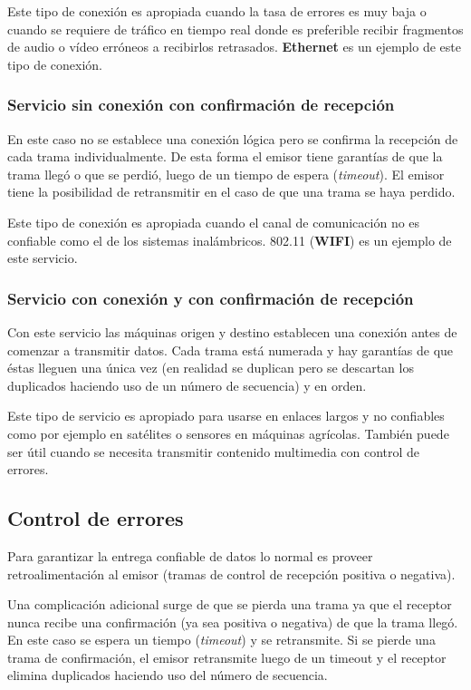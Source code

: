 \documentclass{book}
\begin{document}
	\vspace{3mm}
	Este tipo de conexión es apropiada cuando la tasa de errores es muy baja o cuando se requiere de tráfico en tiempo real donde es preferible recibir fragmentos de audio o vídeo erróneos a recibirlos retrasados. \textbf{Ethernet} es un ejemplo de este tipo de conexión.
	
	\subsubsection{Servicio sin conexión con confirmación de recepción}
	En este caso no se establece una conexión lógica pero se confirma la recepción de cada trama individualmente. De esta forma el emisor tiene garantías de que la trama llegó o que se perdió, luego de un tiempo de espera (\textit{timeout}). El emisor tiene la posibilidad de retransmitir en el caso de que una trama se haya perdido.
	
	\vspace{3mm}
	Este tipo de conexión es apropiada cuando el canal de comunicación no es confiable como el de los sistemas inalámbricos. 802.11 (\textbf{WIFI}) es un ejemplo de este servicio.
	
	\subsubsection{Servicio con conexión y con confirmación de recepción}
	Con este servicio las máquinas origen y destino establecen una conexión antes de comenzar a transmitir datos. Cada trama está numerada y hay garantías de que éstas lleguen una única vez (en realidad se duplican pero se descartan los duplicados haciendo uso de un número de secuencia) y en orden.
	
	\vspace{3mm}
	Este tipo de servicio es apropiado para usarse en enlaces largos y no confiables como por ejemplo en satélites o sensores en máquinas agrícolas. También puede ser útil cuando se necesita transmitir contenido multimedia con control de errores.
	
	\subsection{Control de errores}
	Para garantizar la entrega confiable de datos lo normal es proveer retroalimentación al emisor (tramas de control de recepción positiva o negativa). 
	
	\vspace{3mm}
	Una complicación adicional surge de que se pierda una trama ya que el receptor nunca recibe una confirmación (ya sea positiva o negativa) de que la trama llegó. En este caso se espera un tiempo (\textit{timeout}) y se retransmite. Si se pierde una trama de confirmación, el emisor retransmite luego de un timeout y el receptor elimina duplicados haciendo uso del número de secuencia.
	
\end{document}

